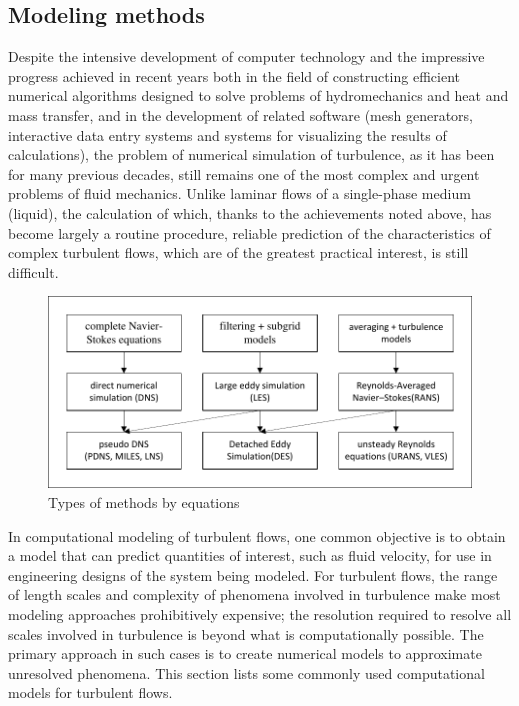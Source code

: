 \subsection{Modeling methods}
	Despite the intensive development of computer technology and the impressive progress achieved in recent years both in the field of constructing efficient numerical algorithms designed to solve problems of hydromechanics and heat and mass transfer, and in the development of related software (mesh generators, interactive data entry systems and systems for visualizing the results of calculations), the problem of numerical simulation of turbulence, as it has been for many previous decades, still remains one of the most complex and urgent problems of fluid mechanics. Unlike laminar flows of a single-phase medium (liquid), the calculation of which, thanks to the achievements noted above, has become largely a routine procedure, reliable prediction of the characteristics of complex turbulent flows, which are of the greatest practical interest, is still difficult.
	\begin{figure}[H]
		\centering
		\includegraphics[width=0.9\linewidth]{../Assets/СхемаМетодовEN}
		\caption{Types of methods by equations}
		\label{fig:cheme}
	\end{figure}
	
	In computational modeling of turbulent flows, one common objective is to obtain a model that can predict quantities of interest, such as fluid velocity, for use in engineering designs of the system being modeled. For turbulent flows, the range of length scales and complexity of phenomena involved in turbulence make most modeling approaches prohibitively expensive; the resolution required to resolve all scales involved in turbulence is beyond what is computationally possible. The primary approach in such cases is to create numerical models to approximate unresolved phenomena. This section lists some commonly used computational models for turbulent flows.
	
